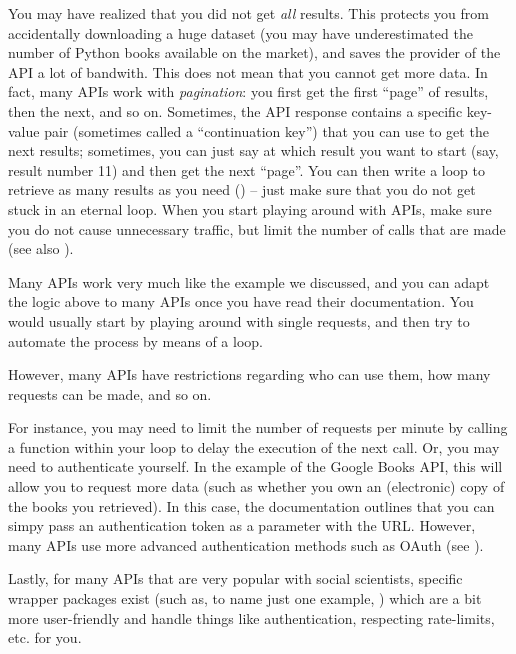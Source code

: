 
You may have realized that you did not get \emph{all} results.
This protects you from accidentally downloading a huge dataset (you
may have underestimated the number of Python books available on the
market), and saves the provider of the API a lot of bandwith.
This does not mean that you cannot get more data. In fact, many APIs work
with \emph{pagination}: you first get the first ``page'' of results,
then the next, and so on. Sometimes, the API response contains
a specific key-value pair (sometimes called a ``continuation key'')
that you can use to get the next results; sometimes, you can just
say at which result you want to start (say, result number 11) and
then get the next ``page''. You can then write a loop to retrieve
as many results as you need () -- just make sure
that you do not get stuck in an eternal loop. When you start playing
around with APIs, make sure you do not cause unnecessary traffic,
but limit the number of calls that are made (see also ).





Many APIs work very much like the example we discussed, and you
can adapt the logic above to many APIs once you have read their
documentation. You would usually start by playing around with
single requests, and then try to automate the process by means
of a loop.

However, many APIs have restrictions regarding who can use them,
how many requests can be made, and so on.

For instance, you may need to limit the number of requests per minute
by calling a  function within your loop to delay the
execution of the next call. Or, you may need to authenticate
yourself. In the example of the Google Books API, this will
allow you to request more data (such as whether you own an
(electronic) copy of the books you retrieved). In this case,
the documentation outlines that you can simpy pass an authentication
token as a parameter with the URL. However, many APIs use
more advanced authentication methods such as OAuth (see ).

Lastly, for many APIs that are very popular with social
scientists, specific wrapper packages exist (such as, to name just one example, )
which are a bit more user-friendly and handle things like authentication,
respecting rate-limits, etc. for you.
